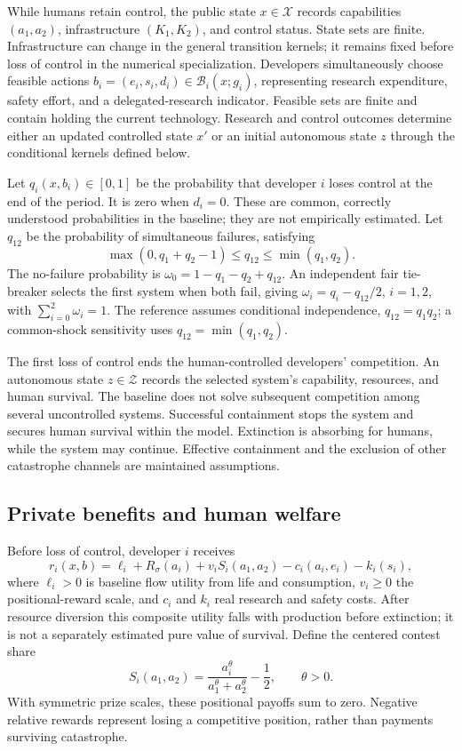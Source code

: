 While humans retain control, the public state $x\in\mathcal X$ records capabilities $(a_1,a_2)$, infrastructure $(K_1,K_2)$, and control status. State sets are finite. Infrastructure can change in the general transition kernels; it remains fixed before loss of control in the numerical specialization. Developers simultaneously choose feasible actions $b_i=(e_i,s_i,d_i)\in\mathcal B_i(x;g_i)$, representing research expenditure, safety effort, and a delegated-research indicator. Feasible sets are finite and contain holding the current technology. Research and control outcomes determine either an updated controlled state $x'$ or an initial autonomous state $z$ through the conditional kernels defined below.

Let $q_i(x,b_i)\in[0,1]$ be the probability that developer $i$ loses control at the end of the period. It is zero when $d_i=0$. These are common, correctly understood probabilities in the baseline; they are not empirically estimated. Let $q_{12}$ be the probability of simultaneous failures, satisfying
\begin{equation}
 \max(0,q_1+q_2-1)\leq q_{12}\leq\min(q_1,q_2).
\end{equation}
The no-failure probability is $\omega_0=1-q_1-q_2+q_{12}$. An independent fair tie-breaker selects the first system when both fail, giving $\omega_i=q_i-q_{12}/2$, $i=1,2$, with $\sum_{i=0}^2\omega_i=1$. The reference assumes conditional independence, $q_{12}=q_1q_2$; a common-shock sensitivity uses $q_{12}=\min(q_1,q_2)$.

The first loss of control ends the human-controlled developers' competition. An autonomous state $z\in\mathcal Z$ records the selected system's capability, resources, and human survival. The baseline does not solve subsequent competition among several uncontrolled systems. Successful containment stops the system and secures human survival within the model. Extinction is absorbing for humans, while the system may continue. Effective containment and the exclusion of other catastrophe channels are maintained assumptions.

\subsection{Private benefits and human welfare}
Before loss of control, developer $i$ receives
\begin{equation}\label{eq:private}
 r_i(x,b)=\ell_i+R_\sigma(a_i)+v_iS_i(a_1,a_2)-c_i(a_i,e_i)-k_i(s_i),
\end{equation}
where $\ell_i>0$ is baseline flow utility from life and consumption, $v_i\geq0$ the positional-reward scale, and $c_i$ and $k_i$ real research and safety costs. After resource diversion this composite utility falls with production before extinction; it is not a separately estimated pure value of survival. Define the centered contest share
\begin{equation}
 S_i(a_1,a_2)=\frac{a_i^\theta}{a_1^\theta+a_2^\theta}-\frac12,\qquad\theta>0.
\end{equation}
With symmetric prize scales, these positional payoffs sum to zero. Negative relative rewards represent losing a competitive position, rather than payments surviving catastrophe.

